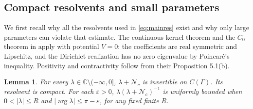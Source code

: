 \documentclass[11pt]{article}
\newtheorem{lemma}[theorem]{Lemma}
\newcommand{\C}{\mathbb C}
\newcommand{\Nc}{\mathcal N_c}
\newcommand{\abs}[1]{\lvert #1\rvert}
\begin{document}
\subsection{Compact resolvents and small parameters}

We first recall why all the resolvents used in \eqref{eq:mainres} exist and
why only large parameters can violate that estimate. The continuous kernel
theorem and the $C_0$ theorem in \cite[Corollary 3.5 and Theorem 5.3(a)]{ArendtElst}
apply with potential $V=0$: the coefficients are real symmetric and
Lipschitz, and the Dirichlet realization has no zero eigenvalue by
Poincar\'e's inequality. Positivity and contractivity follow from their
Proposition 5.1(b).

\begin{lemma}\label{lem:compactres}
For every $\lambda\in\C\setminus(-\infty,0]$, $\lambda+\Nc$ is invertible
on $C(\Gamma)$. Its resolvent is compact. For each $\varepsilon>0$,
$\lambda(\lambda+\Nc)^{-1}$ is uniformly bounded when
$0<\abs\lambda\leq R$ and $\abs{\arg\lambda}\leq\pi-\varepsilon$, for any
fixed finite $R$.
\end{lemma}
\end{document}
